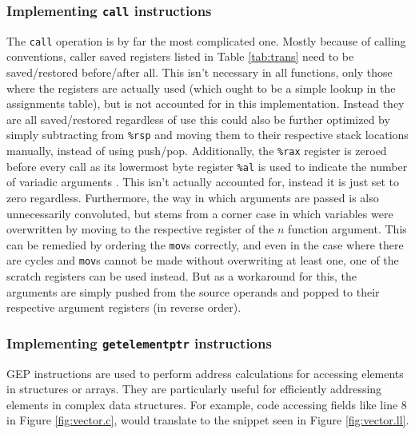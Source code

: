 \documentclass{article}
\begin{document}


\subsubsection{Implementing \texttt{call} instructions} \label{impl-call}

The \texttt{call} operation is by far the most complicated one. Mostly because of calling conventions, caller saved registers listed in Table \ref{tab:trans} need to be saved/restored before/after all. This isn't necessary in all functions, only those where the registers are  actually used (which ought to be a simple lookup in the assignments table), but is not accounted for in this implementation. Instead they are all saved/restored regardless of use this could also be further optimized by simply subtracting from \texttt{\%rsp} and moving them to their respective stack locations manually,  instead of using push/pop.
Additionally, the \texttt{\%rax} register is zeroed before every call as its lowermost byte register \texttt{\%al} is used to indicate the number of variadic arguments \cite[25]{sysv}. This isn't actually accounted for, instead it is just set to zero regardless.
Furthermore, the way in which arguments are passed is also unnecessarily convoluted, but stems from a corner case in which variables were overwritten by moving to the respective register of the \(n\) function argument. This can be remedied by ordering the \texttt{mov}s correctly, and even in the case where there are cycles and \texttt{mov}s cannot be made without overwriting at least one, one of the scratch registers can be used instead. But as a workaround for this, the arguments are simply pushed from the source operands and popped to their respective argument registers (in reverse order).

\subsubsection{Implementing \texttt{getelementptr} instructions}\label{impl-gep}
GEP instructions are used to perform address calculations for accessing elements in  structures or arrays. They are particularly useful for efficiently addressing elements in complex data structures. For example, code accessing fields like line 8 in Figure \ref{fig:vector.c}, would  translate to the snippet seen in Figure \ref{fig:vector.ll}.
\end{document}
